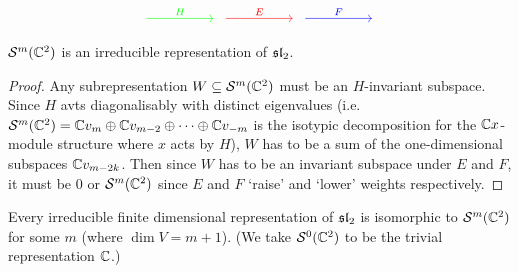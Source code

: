 \begin{equation*}
  \begin{tikzcd}[column sep=huge]
    { } \ar[r, color=green, "H"] & { } \ar[r, color=red, "E"] & { } \ar[r, color=blue, "F"] & { }
  \end{tikzcd}
\end{equation*}

\begin{thm}
  $\mathcal{S}^m(\mathbb{C}^2)$ is an irreducible representation of $\operatorname{\mathfrak{sl}}_2$.
\end{thm}

\begin{proof}
  Any subrepresentation $W \subseteq \mathcal{S}^m(\mathbb{C}^2)$ must be an $H$-invariant subspace.
  Since $H$ avts diagonalisably with distinct eigenvalues (i.e.\@ $\mathcal{S}^m(\mathbb{C}^2) = \mathbb{C} v_m \oplus \mathbb{C} v_{m-2} \oplus \cdots \oplus \mathbb{C} v_{-m}$ is the isotypic decomposition for the $\mathbb{C} x$-module structure where $x$ acts by $H$), $W$ has to be a sum of the one-dimensional subspaces $\mathbb{C} v_{m-2k}$.
  Then since $W$ has to be an invariant subspace under $E$ and $F$, it must be $0$ or $\mathcal{S}^m(\mathbb{C}^2)$ since $E$ and $F$ `raise' and `lower' weights respectively.
\end{proof}

\begin{thm}
  Every irreducible finite dimensional representation of $\operatorname{\mathfrak{sl}}_2$ is isomorphic to $\mathcal{S}^m(\mathbb{C}^2)$ for some $m$ (where $\dim V = m+1$).
  (We take $\mathcal{S}^0(\mathbb{C}^2)$ to be the trivial representation $\mathbb{C}$.)
\end{thm}

